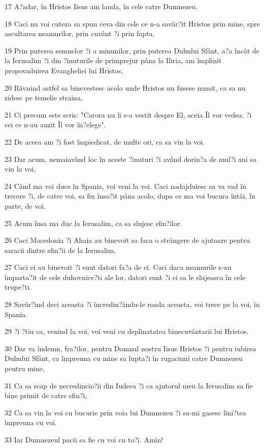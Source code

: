 \par 17 A?adar, în Hristos Iisus am lauda, în cele catre Dumnezeu.
\par 18 Caci nu voi cuteza sa spun ceva din cele ce n-a savâr?it Hristos prin mine, spre ascultarea neamurilor, prin cuvânt ?i prin fapta,
\par 19 Prin puterea semnelor ?i a minunilor, prin puterea Duhului Sfânt, a?a încât de la Ierusalim ?i din ?inuturile de primprejur pâna la Iliria, am împlinit propovaduirea Evangheliei lui Hristos,
\par 20 Râvnind astfel sa binevestesc acolo unde Hristos nu fusese numit, ca sa nu zidesc pe temelie straina,
\par 21 Ci precum este scris: "Carora nu li s-a vestit despre El, aceia Îl vor vedea; ?i cei ce n-au auzit Îl vor în?elege".
\par 22 De aceea am ?i fost împiedicat, de multe ori, ca sa vin la voi.
\par 23 Dar acum, nemaiavând loc în aceste ?inuturi ?i având dorin?a de mul?i ani sa vin la voi,
\par 24 Când ma voi duce în Spania, voi veni la voi. Caci nadajduiesc sa va vad în trecere ?i, de catre voi, sa fiu înso?it pâna acolo, dupa ce ma voi bucura întâi, în parte, de voi.
\par 25 Acum însa ma duc la Ierusalim, ca sa slujesc sfin?ilor.
\par 26 Caci Macedonia ?i Ahaia au binevoit sa faca o strângere de ajutoare pentru saracii dintre sfin?ii de la Ierusalim.
\par 27 Caci ei au binevoit ?i sunt datori fa?a de ei. Caci daca neamurile s-au împarta?it de cele duhovnice?ti ale lor, datori sunt ?i ei sa le slujeasca în cele trupe?ti.
\par 28 Savâr?ind deci aceasta ?i încredin?ându-le roada aceasta, voi trece pe la voi, în Spania.
\par 29 ?i ?tiu ca, venind la voi, voi veni cu deplinatatea binecuvântarii lui Hristos.
\par 30 Dar va îndemn, fra?ilor, pentru Domnul nostru Iisus Hristos ?i pentru iubirea Duhului Sfânt, ca împreuna cu mine sa lupta?i în rugaciuni catre Dumnezeu pentru mine,
\par 31 Ca sa scap de necredincio?ii din Iudeea ?i ca ajutorul meu la Ierusalim sa fie bine primit de catre sfin?i,
\par 32 Ca sa vin la voi cu bucurie prin voia lui Dumnezeu ?i sa-mi gasesc lini?tea împreuna cu voi.
\par 33 Iar Dumnezeul pacii sa fie cu voi cu to?i. Amin!

